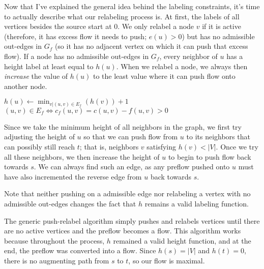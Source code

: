 Now that I've explained the general idea behind the labeling constraints, it's time to actually describe what our relabeling process is. At first, the labels of all vertices besides the source start at 0. We only relabel a node $v$ if it is active (therefore, it has excess flow it needs to push; $e(u) > 0$) but has no admissible out-edges in $G_f$ (so it has no adjacent vertex on which it can push that excess flow). If a node has no admissible out-edges in $G_f$, every neighbor of $u$ has a height label at least equal to $h(u)$. When we relabel a node, we always then \textit{increase} the value of $h(u)$ to the least value where it can push flow onto another node.

\noindent \begin{minipage}{\textwidth}
\begin{algorithmic}
		\State $h(u) \gets \min_{v | (u,v) \in E_f}(h(v)) + 1$
		\Comment $(u,v) \in E_f \iff c_f(u,v) = c(u,v) - f(u,v) > 0$
\EndFunction
\end{algorithmic}
\end{minipage}

Since we take the minimum height of all neighbors in the graph, we first try adjusting the height of $u$ so that we can push flow from $u$ to its neighbors that can possibly still reach $t$; that is, neighbors $v$ satisfying $h(v) < |V|$. Once we try all these neighbors, we then increase the height of $u$ to begin to push flow back towards $s$. We can always find such an edge, as any preflow pushed onto $u$ must have also incremented the reverse edge from $u$ back towards $s$.

Note that neither pushing on a admissible edge nor relabeling a vertex with no admissible out-edges changes the fact that $h$ remains a valid labeling function.

The generic push-relabel algorithm simply pushes and relabels vertices until there are no active vertices and the preflow becomes a flow. This algorithm works because throughout the process, $h$ remained a valid height function, and at the end, the preflow was converted into a flow. Since $h(s) = |V|$ and $h(t) = 0$, there is no augmenting path from $s$ to $t$, so our flow is maximal.

